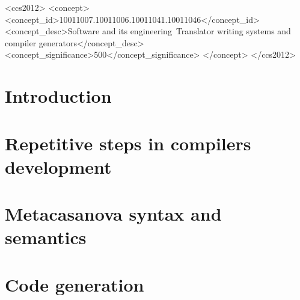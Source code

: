 \documentclass[sigplan,10pt,review]{acmart}\settopmatter{printfolios=true}
\begin{document}
\begin{CCSXML}
 \begin{CCSXML}
	<ccs2012>
	<concept>
	<concept_id>10011007.10011006.10011041.10011046</concept_id>
	<concept_desc>Software and its engineering~Translator writing systems and compiler generators</concept_desc>
	<concept_significance>500</concept_significance>
	</concept>
	</ccs2012>
\end{CCSXML}



\maketitle

\section{Introduction}
\label{sec:introduction}


\section{Repetitive steps in compilers development}
\label{sec:problem}


\section{Metacasanova syntax and semantics}
\label{sec:semantics}


\section{Code generation}
\label{sec:code_generation}



\end{CCSXML}
\end{document}
